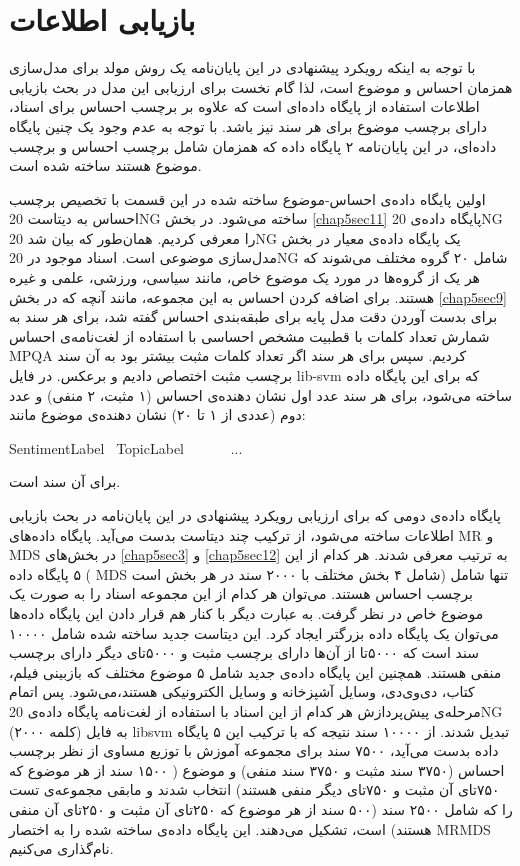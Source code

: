 \section{بازیابی اطلاعات}
\label{chap5sec10}
با توجه به اینکه رویکرد پیشنهادی در  این پایان‌‌نامه یک روش مولد برای مدل‌سازی همزمان احساس و موضوع است، لذا گام نخست برای ارزیابی این مدل در بحث بازیابی اطلاعات استفاده از پایگاه داده‌ای است که علاوه بر برچسب احساس برای اسناد، دارای برچسب موضوع برای هر سند نیز باشد. با توجه به عدم وجود یک چنین پایگاه داده‌ای، در این پایان‌‌نامه ۲ پایگاه داده که همزمان شامل برچسب احساس و برچسب موضوع هستند ساخته شده است.

اولین پایگاه داده‌ی احساس‌-موضوع ساخته شده در این قسمت با تخصیص برچسب احساس به دیتاست
20NG
ساخته می‌‌شود. در بخش
\ref{chap5sec11}
پایگاه داده‌ی
20NG
را معرفی‌ کردیم. همان‌طور که بیان شد
20NG
یک پایگاه داده‌ی معیار در بخش مدل‌سازی موضوعی است. اسناد موجود در
20NG
شامل ۲۰ گروه مختلف می‌‌شوند که هر یک از گروه‌ها در مورد یک موضوع خاص، مانند سیاسی، ورزشی، علمی‌ و غیره هستند. برای اضافه کردن احساس به این مجموعه، مانند آنچه که در بخش
\ref{chap5sec9}
برای بدست آوردن دقت مدل پایه برای طبقه‌بندی احساس گفته شد، برای هر سند به شمارش تعداد کلمات با قطبیت مشخص احساسی‌ با استفاده از 
لغت‌نامه‌ی احساس
MPQA
کردیم. سپس برای هر سند اگر تعداد کلمات مثبت بیشتر بود به آن سند برچسب مثبت اختصاص دادیم و برعکس. در فایل
lib-svm
که برای این پایگاه داده ساخته می‌‌شود، برای هر سند عدد اول نشان دهنده‌ی احساس (۱ مثبت، ۲ منفی‌) و عدد دوم (عددی از ۱ تا ۲۰) نشان 
دهند‌ه‌ی موضوع مانند:\\ 
\begin{latin}
	SentimentLabel \ TopicLabel \ <ID:Count> \ <ID:Count> \ <ID:Count> \ ... 
\end{latin} 
برای آن سند است.

پایگاه داده‌ی دومی‌ که برای ارزیابی رویکرد پیشنهادی در این پایان‌‌نامه در بحث بازیابی اطلاعات ساخته می‌‌شود، از ترکیب چند دیتاست بدست می‌‌آید. 
پایگاه داده‌های
MR
و
MDS
در بخش‌های
\ref{chap5sec3}
و
\ref{chap5sec12}
به ترتیب معرفی‌ شدند. هر کدام از این ۵ پایگاه داده 
(
MDS
 شامل ۴ بخش مختلف با ۲۰۰۰ سند در هر بخش است) 
تنها شامل برچسب احساس هستند. می‌‌توان هر کدام از این مجموعه اسناد را به صورت یک موضوع خاص در نظر گرفت. به عبارت دیگر با کنار هم قرار دادن این پایگاه داده‌ها می‌‌توان یک پایگاه داده بزرگتر ایجاد کرد. این دیتاست جدید ساخته شده شامل ۱۰۰۰۰ سند است که ۵۰۰۰تا از آن‌ها دارای برچسب مثبت و ۵۰۰۰تای دیگر دارای برچسب منفی‌ هستند. همچنین این پایگاه داده‌ی جدید شامل ۵ موضوع مختلف که بازبینی‌ فیلم، کتاب، دی‌وی‌دی، وسایل آشپزخانه و وسایل الکترونیکی‌ هستند،می‌‌شود. پس اتمام مرحله‌ی پیش‌پردازش هر کدام از این اسناد با استفاده از لغت‌نامه پایگاه داد‌ه‌ی
20NG
(۲۰۰۰ کلمه) به فایل
libsvm
تبدیل شدند. از ۱۰۰۰۰ سند نتیجه که با ترکیب این ۵ پایگاه داده بدست می‌‌آید، ۷۵۰۰ سند برای مجموعه آموزش با توزیع مساوی از نظر برچسب احساس (۳۷۵۰ سند مثبت و ۳۷۵۰ سند منفی‌) و موضوع ( ۱۵۰۰ سند از هر موضوع که ۷۵۰تای آن مثبت و ۷۵۰تای دیگر منفی‌ هستند) انتخاب شدند و مابقی 
مجموعه‌ی تست را که شامل ۲۵۰۰ سند (۵۰۰ سند از هر موضوع که ۲۵۰تای آن مثبت و ۲۵۰تای آن منفی‌ هستند) است، تشکیل می‌‌دهند. این پایگاه داده‌ی ساخته شده را به اختصار 
MRMDS
نام‌گذاری می‌کنیم.

